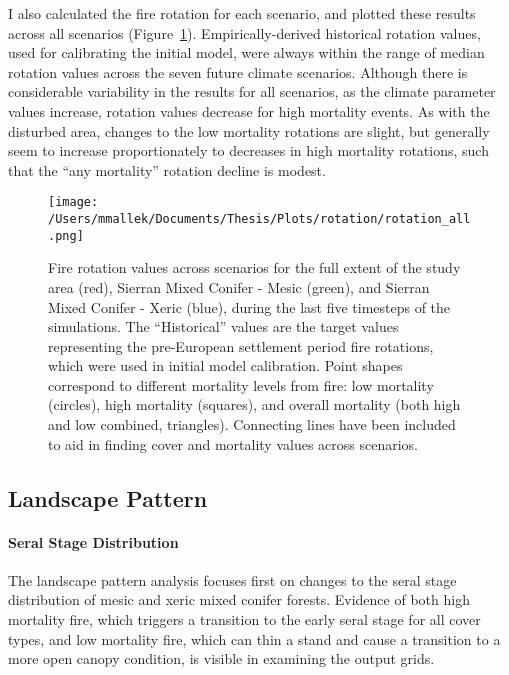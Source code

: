 I also calculated the fire rotation for each scenario, and plotted these results across all scenarios (Figure~\ref{fig:frotation}). Empirically-derived historical rotation values, used for calibrating the initial model, were always within the range of median rotation values across the seven future climate scenarios. Although there is considerable variability in the results for all scenarios, as the climate parameter values increase, rotation values decrease for high mortality events. As with the disturbed area, changes to the low mortality rotations are slight, but generally seem to increase proportionately to decreases in high mortality rotations, such that the ``any mortality'' rotation decline is modest.



\begin{figure}
\centering
\texttt{[image: /Users/mmallek/Documents/Thesis/Plots/rotation/rotation\_all.png]}
\caption{Fire rotation values across scenarios for the full extent of the study area (red), Sierran Mixed Conifer - Mesic (green), and Sierran Mixed Conifer - Xeric (blue), during the last five timesteps of the simulations. The ``Historical'' values are the target values representing the pre-European settlement period fire rotations, which were used in initial model calibration. Point shapes correspond to different mortality levels from fire: low mortality (circles), high mortality (squares), and overall mortality (both high and low combined, triangles). Connecting lines have been included to aid in finding cover and mortality values across scenarios.}
\label{fig:frotation}
\end{figure}



\subsection*{Landscape Pattern}

\paragraph*{Seral Stage Distribution}
The landscape pattern analysis focuses first on changes to the seral stage distribution of mesic and xeric mixed conifer forests. Evidence of both high mortality fire, which triggers a transition to the early seral stage for all cover types, and low mortality fire, which can thin a stand and cause a transition to a more open canopy condition, is visible in examining the output grids.

